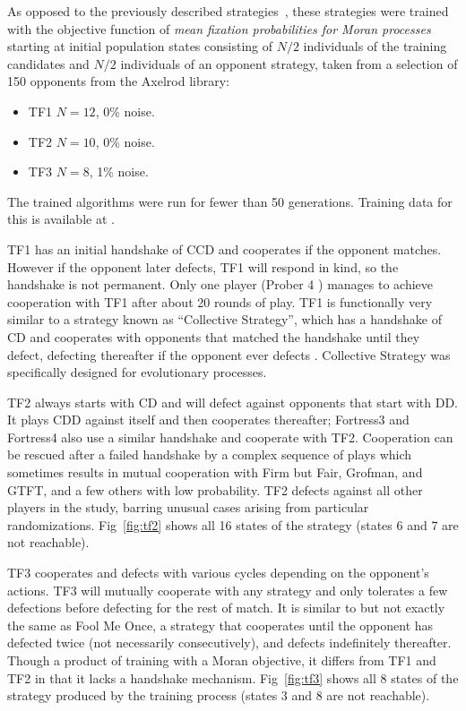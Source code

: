 \documentclass[10pt,letterpaper]{article}
\begin{document}
As opposed to the previously described strategies~\cite{Harper2017}, these
strategies were trained with the objective function of \textit{mean fixation
probabilities for Moran processes} starting at initial population states
consisting of \(N/2\) individuals of the training candidates and \(N/2\)
individuals of an opponent strategy, taken from a selection of 150 opponents
from the Axelrod library:

\begin{itemize}
	\item TF1 \(N=12\), 0\% noise.
	\item TF2 \(N=10\), 0\% noise.
	\item TF3 \(N=8\), 1\% noise.
\end{itemize}

The trained algorithms
were run for fewer than 50 generations. Training data for this is available at
\cite{data}.

TF1 has an initial handshake of CCD and cooperates if the opponent matches.
However if the opponent later defects, TF1 will respond in kind, so the
handshake is not permanent. Only one player (Prober 4 \cite{Prison1998}) manages to
achieve cooperation with TF1 after about 20 rounds of play. TF1 is functionally
very similar to a strategy known as ``Collective Strategy'', which has a
handshake of CD and cooperates with opponents that matched the handshake
until they defect, defecting thereafter if the opponent ever defects \cite{Li2009}.
Collective Strategy was specifically designed for evolutionary processes.

TF2 always starts with CD and will defect against opponents that start with
DD\@. It plays CDD against itself and then cooperates thereafter; Fortress3 and
Fortress4 also use a similar handshake and cooperate with TF2. Cooperation
can be rescued after a failed handshake by a complex sequence of plays
which sometimes results in mutual cooperation with Firm but Fair, Grofman, and
GTFT, and a few others with low probability. TF2 defects against all other
players in the study, barring
unusual cases arising from particular randomizations. Fig~\ref{fig:tf2} shows
all 16 states of the strategy (states 6 and 7 are not reachable).

TF3 cooperates and defects with
various cycles depending on the opponent's actions. TF3 will mutually
cooperate with any strategy and only tolerates a few defections before
defecting for the rest of match. It is similar to but not exactly the same as
Fool Me Once, a strategy that cooperates until the opponent has defected twice
(not necessarily consecutively), and defects indefinitely thereafter. Though a
product of training with a Moran objective, it differs from TF1 and TF2
in that it lacks a handshake mechanism. Fig~\ref{fig:tf3} shows
all 8 states of the strategy produced by the training process (states 3 and 8
are not reachable).
\end{document}
